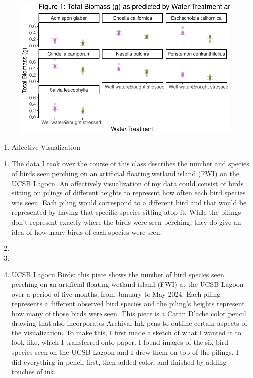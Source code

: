 \documentclass[
  letterpaper,
  DIV=11,
  numbers=noendperiod]{scrartcl}
\providecommand{\tightlist}{%
  \setlength{\itemsep}{0pt}\setlength{\parskip}{0pt}}\usepackage{longtable,booktabs,array}
\begin{document}
\begin{figure}[H]

{\centering \includegraphics{Odile_Gabbiani_homework-03_files/figure-pdf/unnamed-chunk-16-1.pdf}

}

\end{figure}

\begin{enumerate}
\def\labelenumi{\arabic{enumi}.}
\setcounter{enumi}{1}
\tightlist
\item
  Affective Visualization
\end{enumerate}

\begin{enumerate}
\def\labelenumi{\alph{enumi}.}
\item
  The data I took over the course of this class describes the number and
  species of birds seen perching on an artificial floating wetland
  island (FWI) on the UCSB Lagoon. An affectively visualization of my
  data could consist of birds sitting on pilings of different heights to
  represent how often each bird species was seen. Each piling would
  correspond to a different bird and that would be represented by having
  that specific species sitting atop it. While the pilings don't
  represent exactly where the birds were seen perching, they do give an
  idea of how many birds of each species were seen.
\item
\item
\item
  UCSB Lagoon Birds: this piece shows the number of bird species seen
  perching on an artificial floating wetland island (FWI) at the UCSB
  Lagoon over a period of five months, from January to May 2024. Each
  piling represents a different observed bird species and the piling's
  heights represent how many of those birds were seen. This piece is a
  Caran D'ache color pencil drawing that also incorporates Archival Ink
  pens to outline certain aspects of the visualization. To make this, I
  first made a sketch of what I wanted it to look like, which I
  transferred onto paper. I found images of the six bird species seen on
  the UCSB Lagoon and I drew them on top of the pilings. I did
  everything in pencil first, then added color, and finished by adding
  touches of ink.
\end{enumerate}
\end{document}
